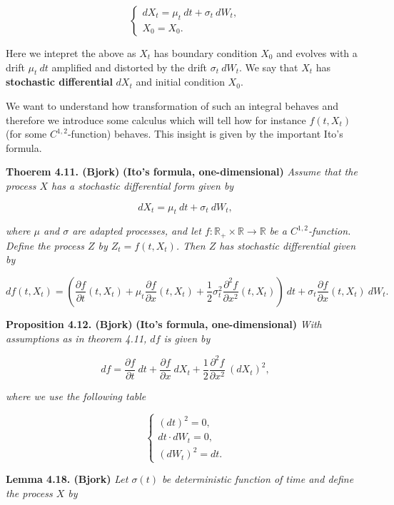 \documentclass[
]{book}
\begin{document}
\[
\left\{\begin{matrix}dX_t=\mu_t\ dt+\sigma_t\ dW_t,\tag{4.17/18}\\ X_0=X_0.\end{matrix}\right.
\]

Here we intepret the above as \(X_t\) has boundary condition \(X_0\) and evolves with a drift \(\mu_t\ dt\) amplified and distorted by the drift \(\sigma_t\ dW_t\). We say that \(X_t\) has \textbf{stochastic differential} \(dX_t\) and initial condition \(X_0\).

We want to understand how transformation of such an integral behaves and therefore we introduce some calculus which will tell how for instance \(f(t,X_t)\) (for some \(C^{1,2}\)-function) behaves. This insight is given by the important Ito's formula.

\textbf{Thoerem 4.11. (Bjork)} \textbf{(Ito's formula, one-dimensional)} \emph{Assume that the process \(X\) has a stochastic differential form given by}

\[
dX_t=\mu_t\ dt + \sigma_t\ dW_t,\tag{4.28}
\]

\emph{where \(\mu\) and \(\sigma\) are adapted processes, and let \(f:\mathbb{R}_+\times\mathbb{R}\to\mathbb{R}\) be a \(C^{1,2}\)-function. Define the process \(Z\) by \(Z_t=f(t,X_t)\). Then \(Z\) has stochastic differential given by}

\[
df(t,X_t)=\left(\frac{\partial f}{\partial t}(t,X_t) + \mu_t\frac{\partial f}{\partial x}(t,X_t) + \frac{1}{2}\sigma^2_t\frac{\partial^2 f}{\partial x^2}(t,X_t)\right)\ dt+\sigma_t\frac{\partial f}{\partial x}(t,X_t)\ dW_t.\tag{4.29}
\]

\textbf{Proposition 4.12. (Bjork)} \textbf{(Ito's formula, one-dimensional)} \emph{With assumptions as in theorem 4.11, \(df\) is given by}

\[
df=\frac{\partial f}{\partial t}\ dt + \frac{\partial f}{\partial x}\ dX_t + \frac{1}{2}\frac{\partial^2 f}{\partial x^2}\ (dX_t)^2,\tag{4.31}
\]

\emph{where we use the following table}

\[
\left\{\begin{matrix}(dt)^2=0,\\ dt\cdot dW_t=0,\\ (dW_t)^2=dt.\end{matrix}\right.
\]

\textbf{Lemma 4.18. (Bjork)} \emph{Let \(\sigma(t)\) be deterministic function of time and define the process \(X\) by}
\end{document}
